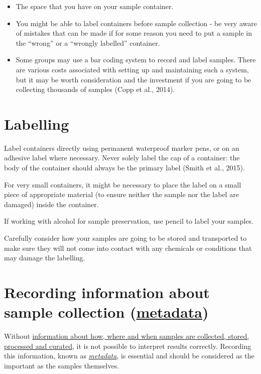 \documentclass[a4paper,oneside]{report}
\providecommand{\tightlist}{%
  \setlength{\itemsep}{0pt}\setlength{\parskip}{0pt}}
\begin{document}
\begin{itemize}
\tightlist
\item
  The space that you have on your sample container.
\item
  You might be able to label containers before sample collection - be
  very aware of mistakes that can be made if for some reason you need to
  put a sample in the ``wrong'' or a ``wrongly labelled'' container.
\item
  Some groups may use a bar coding system to record and label samples.
  There are various costs associated with setting up and maintaining
  such a system, but it may be worth consideration and the investment if
  you are going to be collecting thousands of samples (Copp et al.,
  2014).
\end{itemize}

\hypertarget{labelling}{%
\section{Labelling}\label{labelling}}

Label containers directly using permanent waterproof marker pens, or on
an adhesive label where necessary. Never solely label the cap of a
container: the body of the container should always be the primary label
(Smith et al., 2015).

For very small containers, it might be necessary to place the label on a
small piece of appropriate material (to ensure neither the sample nor
the label are damaged) inside the container.

If working with alcohol for sample preservation, use pencil to label
your samples.

Carefully consider how your samples are going to be stored and
transported to make sure they will not come into contact with any
chemicals or conditions that may damage the labelling.

\hypertarget{recording-information-about-sample-collection-metadata}{%
\section{\texorpdfstring{Recording information about sample collection
(\protect\hyperlink{metadata}{metadata})}{Recording information about sample collection (metadata)}}\label{recording-information-about-sample-collection-metadata}}

Without \protect\hyperlink{metadata}{information about how, where and
when samples are collected, stored, processed and curated}, it is not
possible to interpret results correctly. Recording this information,
known as \protect\hyperlink{metadata}{\emph{metadata}}, is essential and
should be considered as the important as the samples themselves.
\end{document}
